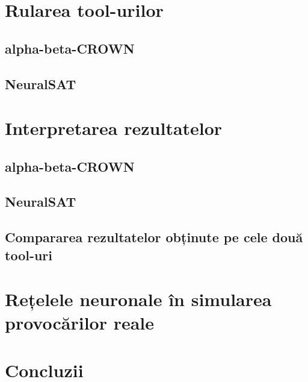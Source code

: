\documentclass[12pt,a4paper]{report}
\begin{document}
\section{Rularea tool-urilor}

    \subsection{alpha-beta-CROWN}
    
    \subsection{NeuralSAT}
    



\section{Interpretarea rezultatelor}

    \subsection{alpha-beta-CROWN}
    
    \subsection{NeuralSAT}
    
    \subsection{Compararea rezultatelor obținute pe cele două tool-uri}
    



\section{Rețelele neuronale în simularea provocărilor reale}



\section{Concluzii}






\end{document}
